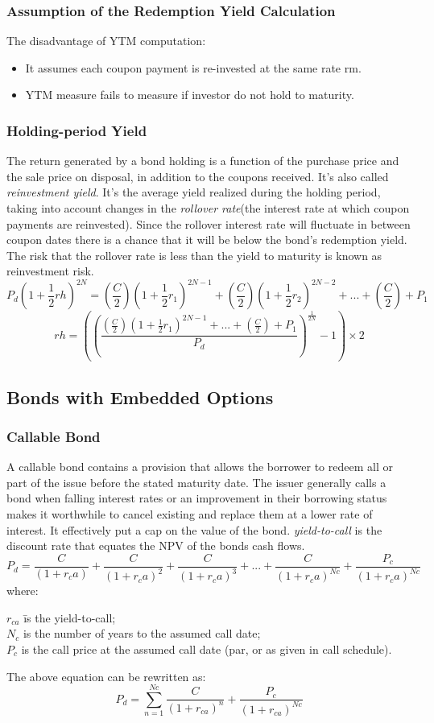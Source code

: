 \documentclass[8pt,a4paper]{article}
\begin{document}
\subsubsection{Assumption of the Redemption Yield Calculation}
The disadvantage of YTM computation:
\begin{itemize}
	\item It assumes each coupon payment is re-invested at the same rate rm.
	\item YTM measure fails to measure if investor do not hold to maturity.
\end{itemize}

\subsubsection{Holding-period Yield}
The return generated by a bond holding is a function of the purchase price and the sale price on disposal, in addition to the coupons received. It's also called \textit{reinvestment yield}. It's the average yield realized during the holding period, taking into account changes in the \textit{rollover rate}(the interest rate at which coupon payments are reinvested). Since the rollover interest rate will fluctuate in between coupon dates there is a chance that it will be below the bond's redemption yield. The risk that the rollover rate is less than the yield to maturity is known as reinvestment risk.
\[
	P_d(1+\frac{1}{2}rh)^{2N}=(\frac{C}{2})(1+\frac{1}{2}r_1)^{2N-1} +
		(\frac{C}{2})(1+\frac{1}{2}r_2)^{2N-2} +...+(\frac{C}{2}) + P_1
\]
\[
	rh=((\frac{(\frac{C}{2})(1+\frac{1}{2}r_1)^{2N-1}+...+(\frac{C}{2}) + P_1}{P_d})^{\frac{1}{2N}} - 1)\times 2
\]

\subsection{Bonds with Embedded Options}
\subsubsection{Callable Bond}
A callable bond contains a provision that allows the borrower to redeem all or part of the issue before the stated maturity date. The issuer generally calls a bond when falling interest rates or an improvement in their borrowing status makes it worthwhile to cancel existing and replace them at a lower rate of interest. It effectively put a cap on the value of the bond. \textit{yield-to-call} is the discount rate that equates the NPV of the bonds cash flows.
\[
	P_d=\frac{C}{(1+r_ca)} +
			\frac{C}{(1+r_ca)^2} +
			\frac{C}{(1+r_ca)^3} + ... +
			\frac{C}{(1+r_ca)^{Nc}} +
			\frac{P_c}{(1+r_ca)^{Nc}}
\]
where:
\begin{tabbing}
$r_{ca}$ 	\= is the yield-to-call;\\
$N_c$		\> is the number of years to the assumed call date;\\
$P_c$		\> is the call price at the assumed call date (par, or as given in call schedule).
\end{tabbing}
The above equation can be rewritten as:
\[
	P_d=\sum_{n=1}^{Nc}\frac{C}{(1+r_{ca})^n} + \frac{P_c}{(1+r_{ca})^{Nc}}
\]
\end{document}
